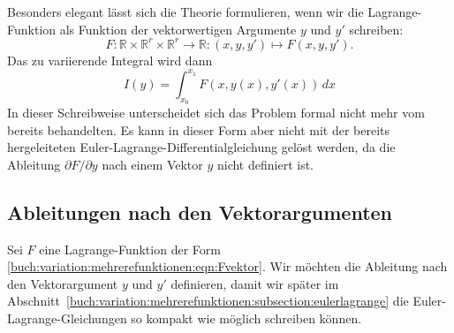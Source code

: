 Besonders elegant lässt sich die Theorie formulieren, wenn wir
die Lagrange-Funktion als Funktion der vektorwertigen Argumente
$y$ und $y'$ schreiben:
\begin{equation}
F
\colon
\mathbb{R}\times\mathbb{R}^r\times\mathbb{R}^r
\to
\mathbb{R}
:
(x,y,y')
\mapsto F(x,y,y').
\label{buch:variation:mehrerefunktionen:eqn:Fvektor}
\end{equation}
Das zu variierende Integral wird dann
\[
I(y)
=
\int_{x_0}^{x_1}
F(x,y(x),y'(x))
\,dx
\]
In dieser Schreibweise unterscheidet sich das Problem formal
nicht mehr vom bereits behandelten.
Es kann in dieser Form aber nicht mit der bereits hergeleiteten
Euler-Lagrange-Differentialgleichung gelöst werden, da die
Ableitung $\partial F/\partial y$ nach einem Vektor $y$ nicht
definiert ist.

%
%
\subsection{Ableitungen nach den Vektorargumenten
\label{buch:variation:mehrerefunktionen:subsection:vektorableitung}}
Sei $F$ eine Lagrange-Funktion der Form
\eqref{buch:variation:mehrerefunktionen:eqn:Fvektor}.
Wir möchten die Ableitung nach den Vektorargument $y$ und $y'$ 
definieren, damit wir später im
Abschnitt~\ref{buch:variation:mehrerefunktionen:subsection:eulerlagrange}
die Euler-Lagrange-Gleichungen so kompakt wie möglich schreiben können.

